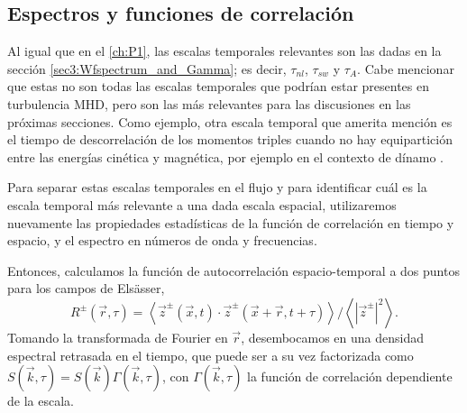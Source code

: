 \subsection{Espectros y funciones de correlación}\label{sec4:Wfspectrum_and_Gamma}

Al igual que en el \cref{ch:P1}, las escalas temporales relevantes son
las dadas en la sección \ref{sec3:Wfspectrum_and_Gamma}; es decir,
$\tau_{nl}$, $\tau_{sw}$ y $\tau_A$. Cabe mencionar que estas no son
todas las escalas temporales que podrían estar presentes en
turbulencia MHD, pero son las más relevantes para las discusiones en
las próximas secciones. Como ejemplo, otra escala temporal que amerita
mención es el tiempo de descorrelación de los momentos triples cuando
no hay equipartición entre las energías cinética y magnética, por
ejemplo en el contexto de dínamo \cite{baerenzung_2008_spectral}.

Para separar estas escalas temporales en el flujo y para identificar
cuál es la escala temporal más relevante a una dada escala espacial,
utilizaremos nuevamente las propiedades estadísticas de
la función de correlación en tiempo y espacio, y el espectro en
números de onda y frecuencias.

Entonces, calculamos la función de autocorrelación espacio-temporal a
dos puntos para los campos de Els\"asser,
\begin{equation}
  R^\pm(\vec{r},\tau) = \left\langle \vec{z}^\pm( \vec{x},t) \cdot
    \vec{z} ^\pm( \vec{x} + \vec{r},t+\tau) \right\rangle \Big/ 
  \left\langle \left|{\vec{z}^\pm}\right|^2 \right\rangle.
  \label{eq4:Rzij}
\end{equation}
Tomando la transformada de Fourier en $\vec{r}$, desembocamos en una densidad
espectral retrasada en el tiempo, que puede ser a su vez factorizada
como $S(\vec{k},\tau) = S(\vec{k})\Gamma(\vec{k},\tau)$, con 
$\Gamma(\vec{k},\tau)$ la función de correlación dependiente de la
escala.

